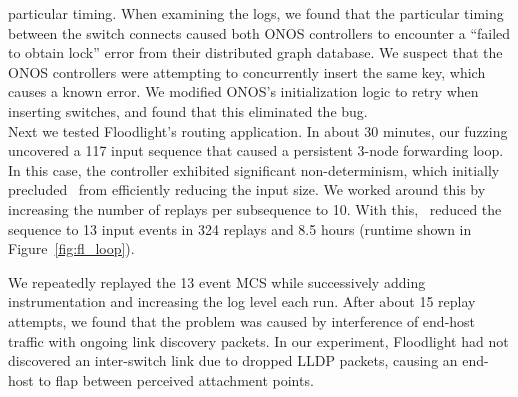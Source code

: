 particular timing. When examining the logs, we found that the particular timing
between the switch connects caused both ONOS controllers to encounter a ``failed
to obtain lock'' error from their distributed graph database. We suspect
that the ONOS controllers were attempting to concurrently insert the same key,
which causes a known error. We modified ONOS's
initialization logic to retry when inserting switches, and found that this
eliminated the bug.\\[0.5ex]
 Next we
tested Floodlight's routing application. In about 30 minutes, our fuzzing
uncovered a 117 input sequence that caused a persistent 3-node forwarding loop.
In this case, the controller exhibited significant non-determinism, which initially
precluded \projectname~from efficiently reducing the input size.
We worked around this by increasing the number of replays per subsequence to 10.
With this, \projectname~reduced the sequence to 13
input events in 324 replays and 8.5 hours (runtime shown in
Figure~\ref{fig:fl_loop}).


We repeatedly replayed the 13 event MCS while successively adding
instrumentation and increasing the log level each run. After about 15 replay
attempts, we found that the problem was caused by interference of end-host
traffic with ongoing link discovery packets. In our experiment, Floodlight had
not discovered an inter-switch link due to dropped LLDP packets, causing an
end-host to flap between perceived attachment points.

